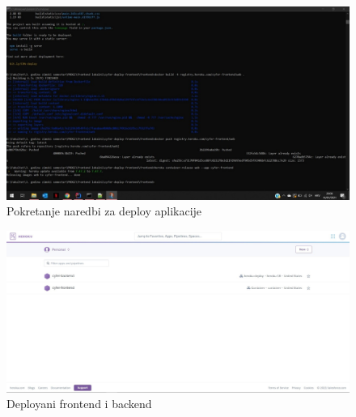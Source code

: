 		\begin{figure}[H]
			\hspace*{-0.4in}
			\includegraphics[scale=1.1]{slike/pustanje2.jpg}
			\caption{Pokretanje naredbi za deploy aplikacije}
			\centering
		\end{figure}
	
		\begin{figure}[H]
			\hspace*{-0.54in}
			\includegraphics[scale=0.45]{slike/pustanje3.jpg}
			\caption{Deployani frontend i backend}
			\centering
		\end{figure}
	
	
		
		
			\eject 